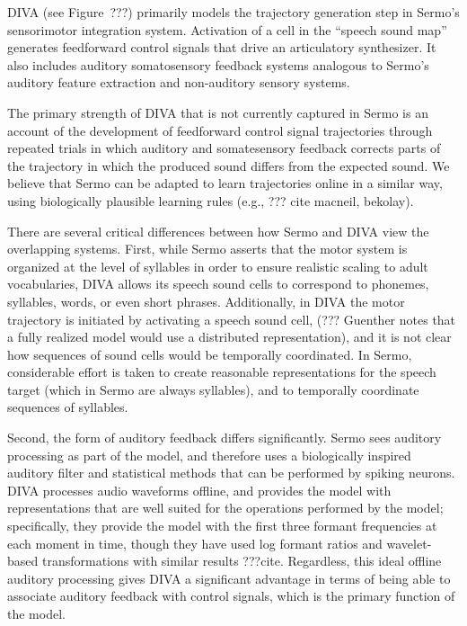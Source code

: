 DIVA (see Figure~???) primarily models
the trajectory generation step
in Sermo's sensorimotor integration system.
Activation of a cell in the ``speech sound map''
generates feedforward control signals
that drive an articulatory synthesizer.
It also includes auditory somatosensory feedback systems
analogous to Sermo's auditory feature extraction
and non-auditory sensory systems.

The primary strength of DIVA
that is not currently captured in Sermo
is an account of the development
of feedforward control signal trajectories
through repeated trials in which
auditory and somatesensory feedback
corrects parts of the trajectory
in which the produced sound differs
from the expected sound.
We believe that Sermo can be adapted
to learn trajectories online in a similar way,
using biologically plausible learning rules
(e.g., ??? cite macneil, bekolay).

There are several critical differences
between how Sermo and DIVA view
the overlapping systems.
First, while Sermo asserts that
the motor system is organized at the level
of syllables in order to ensure
realistic scaling to adult vocabularies,
DIVA allows its speech sound cells to
correspond to phonemes, syllables, words,
or even short phrases.
Additionally, in DIVA
the motor trajectory is initiated
by activating a speech sound cell,
(??? Guenther notes that a fully realized
model would use a distributed representation),
and it is not clear how sequences
of sound cells would be temporally coordinated.
In Sermo, considerable effort is taken
to create reasonable representations
for the speech target
(which in Sermo are always syllables),
and to temporally coordinate
sequences of syllables.

Second, the form of auditory feedback
differs significantly.
Sermo sees auditory processing as part of
the model, and therefore uses
a biologically inspired auditory filter
and statistical methods that can be
performed by spiking neurons.
DIVA processes audio waveforms offline,
and provides the model with
representations that are well suited
for the operations performed by the model;
specifically, they provide the model with
the first three formant frequencies
at each moment in time,
though they have used log formant ratios
and wavelet-based transformations
with similar results ???cite.
Regardless, this ideal offline auditory processing
gives DIVA a significant advantage
in terms of being able to
associate auditory feedback
with control signals,
which is the primary function of the model.

